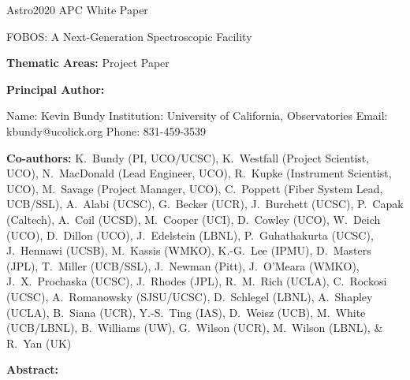 \documentclass[oneside,12pt]{amsart}
\begin{document}
\raggedright
\huge
Astro2020 APC White Paper \linebreak

FOBOS: A Next-Generation Spectroscopic Facility \linebreak
\normalsize

\noindent \textbf{Thematic Areas:} Project Paper
  
\textbf{Principal Author:}

Name:	Kevin Bundy
 \linebreak						
Institution:  University of California, Observatories
 \linebreak
Email:  kbundy@ucolick.org
 \linebreak
Phone:  831-459-3539
 \linebreak
 
\textbf{Co-authors:} {\footnotesize K.~Bundy (PI, UCO/UCSC), K.~Westfall (Project
Scientist, UCO), N.~MacDonald (Lead Engineer, UCO), R.~Kupke
(Instrument Scientist, UCO), M.~Savage (Project Manager, UCO),
C.~Poppett (Fiber System Lead, UCB/SSL), A.~Alabi (UCSC), G.~Becker
(UCR), J.~Burchett (UCSC), P.~Capak (Caltech), A.~Coil (UCSD),
M.~Cooper (UCI), D.~Cowley (UCO), W.~Deich (UCO), D.~Dillon (UCO),
J.~Edelstein (LBNL), P.~Guhathakurta (UCSC), J.~Hennawi (UCSB), M.~Kassis (WMKO),
K.-G.~Lee (IPMU), D.~Masters (JPL), T.~Miller (UCB/SSL), J.~Newman
(Pitt), J.~O'Meara (WMKO), J.~X.~Prochaska (UCSC), J.~Rhodes (JPL), R.~M.~Rich (UCLA),
C.~Rockosi (UCSC), A.~Romanowsky (SJSU/UCSC), D.~Schlegel (LBNL),
A.~Shapley (UCLA), B.~Siana (UCR), Y.-S.~Ting (IAS), D.~Weisz
(UCB), M.~White (UCB/LBNL), B.~Williams (UW), G.~Wilson (UCR),
M.~Wilson (LBNL), \& R.~Yan (UK)}
  \linebreak

\textbf{Abstract:} 
\end{document}
